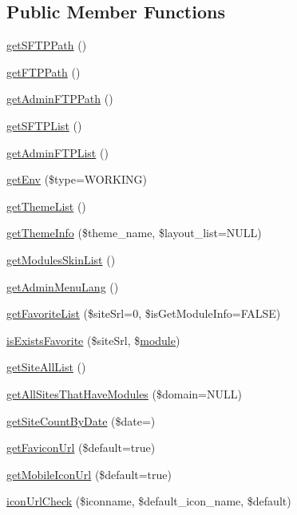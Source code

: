 \subsection*{Public Member Functions}
\begin{DoxyCompactItemize}
\item 
\hyperlink{classadminAdminModel_aaeac1a0a11439dfb4faa74751da8747e}{get\+S\+F\+T\+P\+Path} ()
\item 
\hyperlink{classadminAdminModel_a388c46fe906b6658eda70407ff9cdadb}{get\+F\+T\+P\+Path} ()
\item 
\hyperlink{classadminAdminModel_a155e29f18f17c6c657a457fcd65fd24b}{get\+Admin\+F\+T\+P\+Path} ()
\item 
\hyperlink{classadminAdminModel_adea58838b8595a28dc84d562bd1816ed}{get\+S\+F\+T\+P\+List} ()
\item 
\hyperlink{classadminAdminModel_a9e944aba1586e011811993745738728e}{get\+Admin\+F\+T\+P\+List} ()
\item 
\hyperlink{classadminAdminModel_aae89799bb4f84379b6adb15a01dd6c8b}{get\+Env} (\$type=\textquotesingle{}W\+O\+R\+K\+I\+NG\textquotesingle{})
\item 
\hyperlink{classadminAdminModel_a2a331c8f7fea9c12f56f5f5f75a3960c}{get\+Theme\+List} ()
\item 
\hyperlink{classadminAdminModel_afa7d3525c94669a9cdd141051213a765}{get\+Theme\+Info} (\$theme\+\_\+name, \$layout\+\_\+list=N\+U\+LL)
\item 
\hyperlink{classadminAdminModel_adde903c6e5edecd8b68b1afb232c92fe}{get\+Modules\+Skin\+List} ()
\item 
\hyperlink{classadminAdminModel_a6e21a5731925dc94cce1859dd96e7f25}{get\+Admin\+Menu\+Lang} ()
\item 
\hyperlink{classadminAdminModel_aa50a1de27a9e8431e5a17fffc053dc1e}{get\+Favorite\+List} (\$site\+Srl=0, \$is\+Get\+Module\+Info=F\+A\+L\+SE)
\item 
\hyperlink{classadminAdminModel_a6ba3dfaa5f5f1cc41284676b9e0b7b9d}{is\+Exists\+Favorite} (\$site\+Srl, \$\hyperlink{classmodule}{module})
\item 
\hyperlink{classadminAdminModel_a12f25a1c61e11bf727019171564b1cad}{get\+Site\+All\+List} ()
\item 
\hyperlink{classadminAdminModel_afca5a07a3f42ccc8c2f635557c668b44}{get\+All\+Sites\+That\+Have\+Modules} (\$domain=N\+U\+LL)
\item 
\hyperlink{classadminAdminModel_aed8487a6deb0041ea43b2cd66a6339c0}{get\+Site\+Count\+By\+Date} (\$date=\textquotesingle{}\textquotesingle{})
\item 
\hyperlink{classadminAdminModel_a94cadc80816d875f0713507d356c422b}{get\+Favicon\+Url} (\$default=true)
\item 
\hyperlink{classadminAdminModel_a3ebcb91feca1cf88d6ed0bce9355ca6b}{get\+Mobile\+Icon\+Url} (\$default=true)
\item 
\hyperlink{classadminAdminModel_ab77b7dd452e81ca285debe37a159e0d7}{icon\+Url\+Check} (\$iconname, \$default\+\_\+icon\+\_\+name, \$default)
\end{DoxyCompactItemize}
